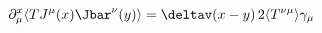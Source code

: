 \begin{equation}
\label{eq:wt_3}
  \partial^x_\mu\langle T J^\mu(x)\Jbar^\nu(y) \rangle
  =\deltav(x-y)\, 2\langle T^{\nu\mu}\rangle\gamma_\mu
\end{equation}

